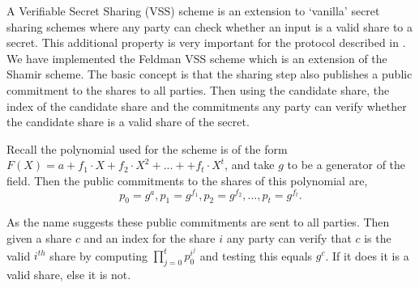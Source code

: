 \documentclass[ %
                    author={Nicholas Tutte},
                supervisor={Prof. Nigel Smart},
                    degree={MEng},
                     title={Secure Two Party Computation},
                  subtitle={A practical comparison of recent protocols},
                      type={Research - GG1K},
                      year={2015} ]{dissertation}
\begin{document}
\begin{appendices}
					A Verifiable Secret Sharing (VSS) scheme is an extension to `vanilla' secret sharing schemes where any party can check whether an input is a valid share to a secret. This additional property is very important for the protocol described in \cite{Katz_Symm_CnC_2013}.\\

					We have implemented the Feldman VSS scheme which is an extension of the Shamir scheme. The basic concept is that the sharing step also publishes a public commitment to the shares to all parties. Then using the candidate share, the index of the  candidate share and the commitments any party can verify whether the candidate share is a valid share of the secret.

					Recall the polynomial used for the scheme is of the form $F(X) = a + f_1 \cdot X + f_2 \cdot X^2 + ... +  + f_t \cdot X ^ t$, and take $g$ to be a generator of the field. Then the public commitments to the shares of this polynomial are,
					$$p_0 = g^a, p_1 = g^{f_1}, p_2 = g^{f_2}, ..., p_t = g^{f_t}.$$
					
					As the name suggests these public commitments are sent to all parties. Then given a share $c$ and an index for the share $i$ any party can verify that $c$ is the valid $i^{th}$ share by computing $\prod_{j=0}^{t} p_0 ^ {i ^ j}$ and testing this equals $g ^ c$. If it does it is a valid share, else it is not.
		
			
	\end{appendices}
\end{document}
